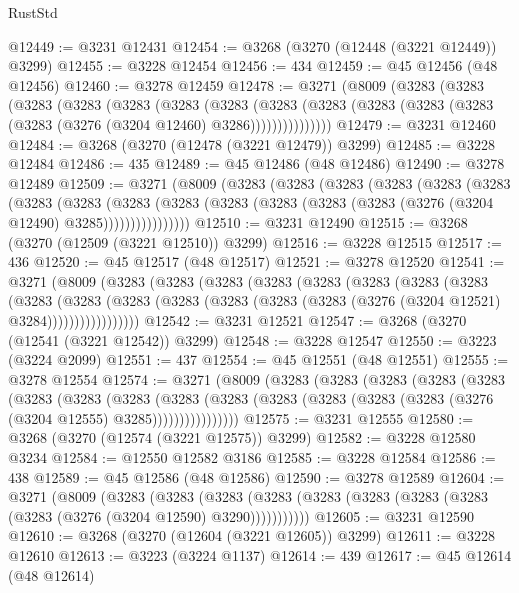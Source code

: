 \begin{lexlean}{RustStd}
\begin{coremodule}
{\begin{coremodule}
{{{{{{{{{{{{{{{{{{{{{{{{{{{{{{{{{{{{{@12449 := @3231 @12431
@12454 := @3268 (@3270 (@12448 (@3221 @12449)) @3299)
@12455 := @3228 @12454
@12456 := 434
@12459 := @45 @12456 (@48 @12456)
@12460 := @3278 @12459
@12478 := @3271
    (@8009
      (@3283
        (@3283
          (@3283
            (@3283
              (@3283
                (@3283
                  (@3283
                    (@3283
                      (@3283 (@3283 (@3283 (@3283 (@3283 (@3276 (@3204 @12460) @3286)))))))))))))))
@12479 := @3231 @12460
@12484 := @3268 (@3270 (@12478 (@3221 @12479)) @3299)
@12485 := @3228 @12484
@12486 := 435
@12489 := @45 @12486 (@48 @12486)
@12490 := @3278 @12489
@12509 := @3271
    (@8009
      (@3283
        (@3283
          (@3283
            (@3283
              (@3283
                (@3283
                  (@3283
                    (@3283
                      (@3283
                        (@3283
                          (@3283 (@3283 (@3283 (@3283 (@3276 (@3204 @12490) @3285))))))))))))))))
@12510 := @3231 @12490
@12515 := @3268 (@3270 (@12509 (@3221 @12510)) @3299)
@12516 := @3228 @12515
@12517 := 436
@12520 := @45 @12517 (@48 @12517)
@12521 := @3278 @12520
@12541 := @3271
    (@8009
      (@3283
        (@3283
          (@3283
            (@3283
              (@3283
                (@3283
                  (@3283
                    (@3283
                      (@3283
                        (@3283
                          (@3283
                            (@3283 (@3283 (@3283 (@3283 (@3276 (@3204 @12521) @3284)))))))))))))))))
@12542 := @3231 @12521
@12547 := @3268 (@3270 (@12541 (@3221 @12542)) @3299)
@12548 := @3228 @12547
@12550 := @3223 (@3224 @2099)
@12551 := 437
@12554 := @45 @12551 (@48 @12551)
@12555 := @3278 @12554
@12574 := @3271
    (@8009
      (@3283
        (@3283
          (@3283
            (@3283
              (@3283
                (@3283
                  (@3283
                    (@3283
                      (@3283
                        (@3283
                          (@3283 (@3283 (@3283 (@3283 (@3276 (@3204 @12555) @3285))))))))))))))))
@12575 := @3231 @12555
@12580 := @3268 (@3270 (@12574 (@3221 @12575)) @3299)
@12582 := @3228 @12580 @3234
@12584 := @12550 @12582 @3186
@12585 := @3228 @12584
@12586 := 438
@12589 := @45 @12586 (@48 @12586)
@12590 := @3278 @12589
@12604 := @3271
    (@8009
      (@3283
        (@3283
          (@3283 (@3283 (@3283 (@3283 (@3283 (@3283 (@3283 (@3276 (@3204 @12590) @3290)))))))))))
@12605 := @3231 @12590
@12610 := @3268 (@3270 (@12604 (@3221 @12605)) @3299)
@12611 := @3228 @12610
@12613 := @3223 (@3224 @1137)
@12614 := 439
@12617 := @45 @12614 (@48 @12614)
}}}}}}}}}}}}}}}}}}}}}}}}}}}}}}}}}}}}}
\end{coremodule}}
\end{coremodule}
\end{lexlean}
